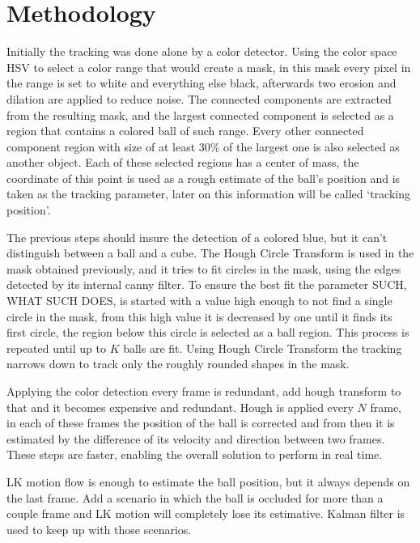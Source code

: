 \documentclass[10pt,twocolumn,letterpaper]{article}
\begin{document}
\section{Methodology}

  Initially the tracking was done alone by a color detector. Using the color
  space HSV to select a color range that would create a mask, in this mask every
  pixel in the range is set to white and everything else black, afterwards two
  erosion and dilation are applied to reduce noise. The connected components
  are extracted from the resulting mask, and the largest connected component is
  selected as a region that contains a colored ball of such range. Every other
  connected component region with size of at least 30\% of the largest one is
  also selected as another object. Each of these selected regions has a center
  of mass, the coordinate of this point is used as a rough estimate of
  the ball's position and is taken as the tracking parameter, later on this
  information will be called `tracking position'.

  The previous steps should insure the detection of a colored blue, but it can't
  distinguish between a ball and a cube. The Hough Circle Transform is used in
  the mask obtained previously, and it tries to fit circles in the mask, using
  the edges detected by its internal canny filter. To ensure the best fit the
  parameter SUCH, WHAT SUCH DOES, is started with a value high enough to not
  find a single circle in the mask, from this high value it is decreased by one
  until it finds its first circle, the region below this circle is selected as a
  ball region. This process is repeated until up to $K$ balls are fit. Using
  Hough Circle Transform the tracking narrows down to track only the roughly
  rounded shapes in the mask.

  Applying the color detection every frame is redundant, add hough transform to
  that and it becomes expensive and redundant. Hough is applied every $N$ frame,
  in each of these frames the position of the ball is corrected and from then it
  is estimated by the difference of its velocity and direction between two
  frames. These steps are faster, enabling the overall solution to perform in
  real time.

  LK motion flow is enough to estimate the ball position, but it always depends
  on the last frame. Add a scenario in which the ball is occluded for more than
  a couple frame and LK motion will completely lose its estimative. Kalman
  filter is used to keep up with those scenarios.
\end{document}
